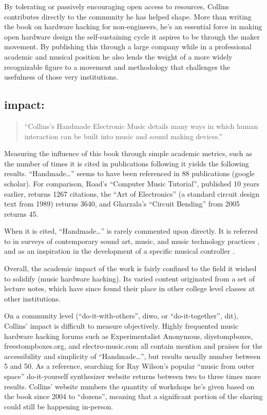 	By tolerating or passively encouraging open access to resources, Collins contributes directly to the community he has helped shape. More than writing the book on hardware hacking for non-engineers, he’s an essential force in making open hardware design the self-sustaining cycle it aspires to be through the maker movement. By publishing this through a large company while in a professional academic and musical position he also lends the weight of a more widely recognizable figure to a movement and methodology that challenges the usefulness of those very institutions.

\subsection{impact:}  

\begin{quote}

“Collins’s Handmade Electronic Music details many ways in which human interaction can be built into music and sound making devices.”

\cite{mills2010}

\end{quote}

	Measuring the influence of this book through simple academic metrics, such as the number of times it is cited in publications following it \cite{harzing2008} yields the following results. “Handmade…” seems to have been referenced in 88 publications (google scholar). For comparison, Road’s “Computer Music Tutorial”, published 10 years earlier, returns 1267 citations, the “Art of Electronics” (a standard circuit design text from 1989) returns 3640, and Gharzala’s “Circuit Bending” from 2005 returns 45. 

	When it is cited, “Handmade…” is rarely commented upon directly. It is referred to in surveys of contemporary sound art, music, and music technology practices \cite{kelly2011,mills2010,pigott2011,rodgers2010}, and as an inspiration in the development of a specific musical controller \cite{ariza2007,hoadley2010,murphy2010,riis2013,valle2011}.
	
	Overall, the academic impact of the work is fairly confined to the field it wished to solidify (music hardware hacking). Its varied content originated from a set of lecture notes, which have since found their place in other college level classes at other institutions. 

On a community level (“do-it-with-others”, diwo, or “do-it-together”, dit), Collins’ impact is difficult to measure objectively. Highly frequented music hardware hacking forums such as Experimentalist Anonymous, diystompboxes, freestompboxes.org, and electro-music.com all contain mention and praises for the accessibility and simplicity of “Handmade…”, but results usually number between 5 and 50. As a reference, searching for Ray Wilson’s popular “music from outer space” do-it-yourself synthesizer website returns between two to three times more results. Collins’ website numbers the quantity of workshops he’s given based on the book since 2004 to “dozens”, meaning that a significant portion of the sharing could still be happening in-person.  

